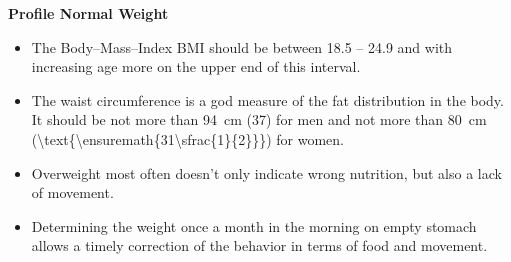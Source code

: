 \documentclass[../main.tex]{subfiles}
\begin{document}
\vspace{5mm}
\noindent
\begin{fminipage}{\textwidth}
  \textbf{Profile Normal Weight}
  \begin{itemize}
  \item The Body--Mass--Index BMI should be between 18.5 -- 24.9 and with increasing age more on the upper end of this interval.
  \item The waist circumference is a god measure of the fat distribution in the body. It should be not more than \SI{94}{\cm} (\SI{37}{\in}) for men
    and not more than \SI{80}{\cm} (\SI[parse-numbers=false]{\text{\ensuremath{31\sfrac{1}{2}}}}{\in}) for women.
  \item Overweight most often doesn't only indicate wrong nutrition, but also a lack of movement.
    \item Determining the weight once  a month in the morning on empty stomach allows a timely correction of the behavior in terms of food and movement. 
  \end{itemize}
  \end{fminipage}
\end{document}
